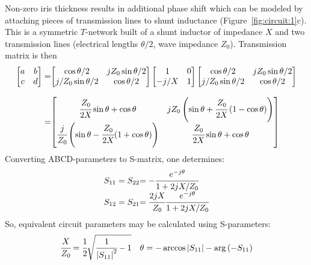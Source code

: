\documentclass{pj}
\begin{document}
Non-zero iris thickness results in additional phase shift which can be
modeled by attaching pieces of transmission lines to shunt inductance
(Figure~\ref{fig:circuit:1}c).  This is a symmetric $T$-network built
of a shunt inductor of impedance $X$ and two transmission lines
(electrical lengths $\theta/2$, wave impedance $Z_0$). Transmission
matrix is then
\begin{equation}
  \label{eq:abcd_matrix}
  \begin{array}{r@{}l}
  \begin{bmatrix}
    a & b \\
    c & d
  \end{bmatrix}
        = & 
  \begin{bmatrix}
    \cos{\theta/2} & j Z_0 \sin{\theta/2} \\
    j/Z_0 \sin{\theta/2} & \cos{\theta/2}
  \end{bmatrix}
  \begin{bmatrix}
    1 & 0 \\
    -j/X & 1
  \end{bmatrix}
  \begin{bmatrix}
    \cos{\theta/2} & j Z_0 \sin{\theta/2} \\
    j/Z_0 \sin{\theta/2} & \cos{\theta/2}
  \end{bmatrix} \\
    & \\
    = &
        \begin{bmatrix}
          \cfrac{Z_0}{2 X} \sin{\theta} + \cos{\theta} & j Z_0
          \left(\sin{\theta + \cfrac{Z_0}{2 X}
              \left(1-\cos{\theta}\right)}\right) \\
          \cfrac{j}{Z_0} \left(\sin{\theta} - \cfrac{Z_0}{2 X} (1 +
            \cos{\theta})\right) & \cfrac{Z_0}{2 X} \sin{\theta} + \cos{\theta}
        \end{bmatrix}
  \end{array}
\end{equation}
Converting ABCD-parameters to S-matrix, one determines:
\begin{equation}
  \label{eq:abcd_to_s}
  \begin{array}{r@{}l}
    S_{11} = S_{22} & = - \cfrac{e^{-j\theta}}{1 + 2jX/Z_0} \\
    S_{12} = S_{21} & = \cfrac{2j X}{Z_0} \cfrac{e^{-j\theta}}{1 + 2jX/Z_0} \\
  \end{array}
\end{equation}
So, equivalent circuit parameters may be calculated using S-parameters:
\begin{equation}
  \label{eq:equivalent_circuit}
  \cfrac{X}{Z_0} = \cfrac{1}{2}\sqrt{\cfrac{1}{\left|S_{11}\right|^2}-1} \quad
  \theta = -\arccos{\left|S_{11}\right|} - \arg{\left(-S_{11}\right)}
\end{equation}
\end{document}
